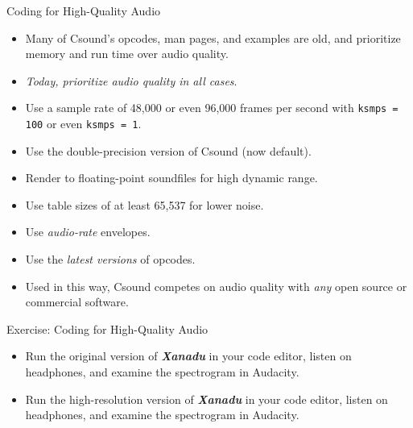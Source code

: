 \documentclass{beamer}
\begin{document}
    \begin{frame}{Coding for High-Quality Audio}
        \begin{itemize}
            \item Many of Csound's opcodes, man pages, and examples are old, and
            prioritize memory and run time over audio quality.
            \item \textit{Today, prioritize audio quality in all cases}.
            \item Use a sample rate of 48,000 or even 96,000 frames per second with
            \texttt{ksmps = 100} or even \texttt{ksmps = 1}.
            \item Use the double-precision version of Csound (now default).
            \item Render to floating-point soundfiles for high dynamic range.
            \item Use table sizes of at least 65,537 for lower noise.
            \item Use \textit{audio-rate} envelopes.
            \item Use the \textit{latest versions} of opcodes.
            \item Used in this way, Csound competes on audio quality with
            \textit{any} open source or commercial software.
        \end{itemize}
    \end{frame}
    \begin{frame}{Exercise: Coding for High-Quality Audio}
        \begin{itemize}
            \item Run the original version of \textit{\textbf{Xanadu}} in your code
            editor, listen on headphones, and examine the spectrogram in Audacity.
            \item Run the high-resolution version of \textit{\textbf{Xanadu}} in
            your code editor, listen on headphones, and examine the spectrogram in Audacity.
        \end{itemize}
    \end{frame}
    
\end{document}
